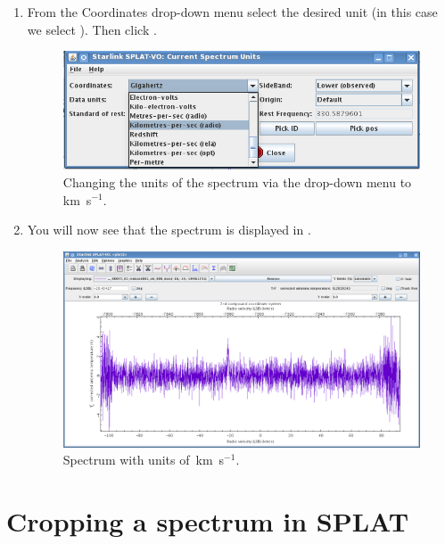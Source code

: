 \documentclass[11pt,oneside,chapters]{starlink}
\newcommand{\kms}{\mbox{$\,$km~s$^{-1}$}}   %
\newcommand{\kms}{\,km~s$^{-1}$}   %
\begin{document}
\begin{enumerate}[label=(\textbf{\arabic*})]
\item From the Coordinates drop-down menu select the desired unit
(in this case we select ).
Then click .

\begin{figure}[h!]
\begin{center}
\includegraphics[width=0.7\linewidth]{sc20_splat_spectrum_units3}
\caption[Changing the units via the drop-down menu.]{\label{fig:splat_units2}
  Changing the units of the spectrum via the drop-down menu to \kms.}
\end{center}
\end{figure}

\item You will now see that the spectrum is
displayed in .

\begin{figure}[h!]
\begin{center}
\includegraphics[width=0.9\linewidth]{sc20_splat_spectrum_units4}
\caption[Spectrum with units of \kms.]{\label{fig:splat_units3}
  Spectrum with units of \kms.}
\end{center}
\end{figure}

\end{enumerate}


\section{Cropping a spectrum in SPLAT}
\label{sec:splat-crop}
\end{document}

